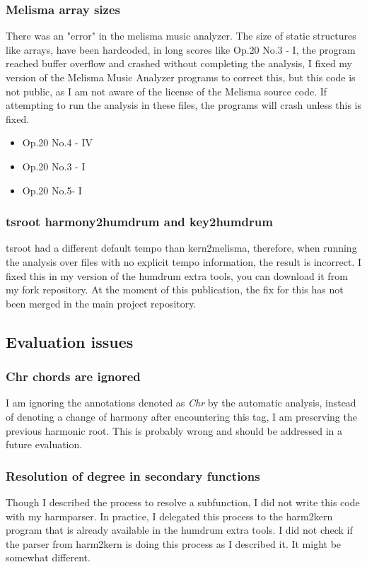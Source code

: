 		\subsubsection{Melisma array sizes}
    There was an "error" in the melisma music analyzer. The size of static structures like arrays, have been hardcoded, in long scores like Op.20 No.3 - I, the program reached buffer overflow and crashed without completing the analysis, I fixed my version of the Melisma Music Analyzer programs to correct this, but this code is not public, as I am not aware of the license of the Melisma source code. If attempting to run the analysis in these files, the programs will crash unless this is fixed.
    \begin{itemize}
    \item Op.20 No.4 - IV
    \item Op.20 No.3 - I
    \item Op.20 No.5- I
    \end{itemize}
		\subsubsection{tsroot harmony2humdrum and key2humdrum}
    tsroot had a different default tempo than kern2melisma, therefore, when running the analysis over files with no explicit tempo information, the result is incorrect. I fixed this in my version of the humdrum extra tools, you can download it from my fork repository. At the moment of this publication, the fix for this has not been merged in the main project repository.
	\subsection{Evaluation issues}
		\subsubsection{Chr chords are ignored}
    I am ignoring the annotations denoted as \emph{Chr} by the automatic analysis, instead of denoting a change of harmony after encountering this tag, I am preserving the previous harmonic root. This is probably wrong and should be addressed in a future evaluation.
		\subsubsection{Resolution of degree in secondary functions}
    Though I described the process to resolve a subfunction, I did not write this code with my harmparser. In practice, I delegated this process to the harm2kern program that is already available in the humdrum extra tools. I did not check if the parser from harm2kern is doing this process as I described it. It might be somewhat different.
